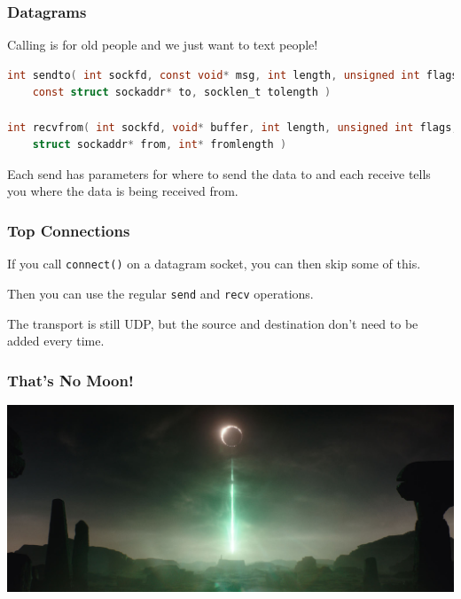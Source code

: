 \begin{frame}[fragile]
	\frametitle{Datagrams}

	Calling is for old people and we just want to text people!

	\begin{lstlisting}[language=C]
int sendto( int sockfd, const void* msg, int length, unsigned int flags, 
    const struct sockaddr* to, socklen_t tolength )

int recvfrom( int sockfd, void* buffer, int length, unsigned int flags, 
    struct sockaddr* from, int* fromlength )
\end{lstlisting}

	Each send has parameters for where to send the data to and each receive tells you where the data is being received from.

\end{frame}



\begin{frame}
	\frametitle{Top Connections}

	If you call \texttt{connect()} on a datagram socket, you can then skip some of this.

	Then you can use the regular \texttt{send} and \texttt{recv} operations.

	The transport is still UDP, but the source and destination don't need to be added every time.

\end{frame}



\begin{frame}
	\frametitle{That's No Moon!}

	\begin{center}
		\includegraphics[width=\textwidth]{images/jedha.jpg}
	\end{center}


\end{frame}



